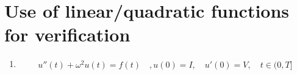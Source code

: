 \documentclass[10pt]{article}
\begin{document}
\title{}
\author{Oliver Hebnes, oliverlh}
\maketitle

\section {Use of linear/quadratic functions for verification}
\begin{enumerate}[label=(\alph*)]
  \item
  \begin{align}
    u''(t) + \omega^2 u(t) = f(t) \quad,
    u(0)=I, \quad
    u'(0)=V, \quad
    t \in (0,T]
  \end{align}


\end{enumerate}
\end{document}
